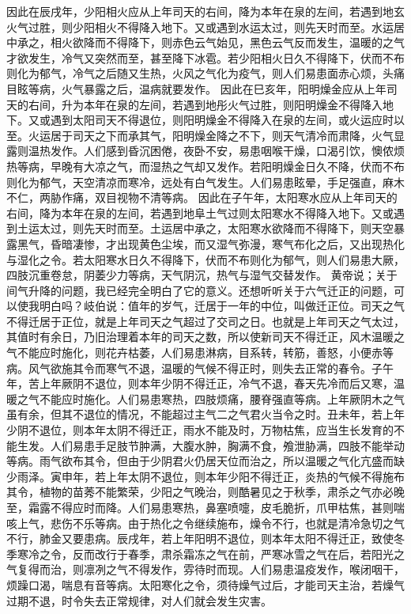 \documentclass[a4paper,12pt,UTF8,twoside]{ctexbook}
\begin{document}
因此在辰戌年，少阳相火应从上年司天的右间，降为本年在泉的左间，若遇到地玄火气过胜，则少阳相火不得降入地下。又或遇到水运太过，则先天时而至。水运居中承之，相火欲降而不得降下，则赤色云气始见，黑色云气反而发生，温暖的之气才欲发生，冷气又突然而至，甚至降下冰雹。若少阳相火日久不得降下，伏而不布则化为郁气，冷气之后随又生热，火风之气化为疫气，则人们易患面赤心烦，头痛目眩等病，火气暴露之后，温病就要发作。
因此在巳亥年，阳明燥金应从上年司天的右间，升为本年在泉的左间，若遇到地彤火气过胜，则阳明燥金不得降入地下。又或遇到太阳司天不得退位，则阳明燥金不得降入在泉的左间，或火运应时以至。火运居于司天之下而承其气，阳明燥金降之不下，则天气清冷而肃降，火气显露则温热发作。人们感到昏沉困倦，夜卧不安，易患咽喉干燥，口渴引饮，懊侬烦热等病，早晚有大凉之气，而湿热之气却又发作。若阳明燥金日久不降，伏而不布则化为郁气，天空清凉而寒冷，远处有白气发生。人们易患眩晕，手足强直，麻木不仁，两胁作痛，双目视物不清等病。
因此在子午年，太阳寒水应从上年司天的右间，降为本年在泉的左间，若遇到地阜土气过则太阳寒水不得降入地下。又或遇到土运太过，则先天时而至。土运居中承之，太阳寒水欲降而不得降下，则天空暴露黑气，昏暗凄惨，才出现黄色尘埃，而又湿气弥漫，寒气布化之后，又出现热化与湿化之令。若太阳寒水日久不得降下，伏而不布则化为郁气，则人们易患大厥，四肢沉重卷怠，阴萎少力等病，天气阴沉，热气与湿气交替发作。
黄帝说；关于间气升降的问题，我已经完全明白了它的意义。还想听听关于六气迁正的问题，可以使我明白吗？岐伯说：值年的岁气，迁居于一年的中位，叫做迁正位。司天之气不得迁居于正位，就是上年司天之气超过了交司之日。也就是上年司天之气太过，其值时有余日，乃旧治理着本年的司天之数，所以使新司天不得迁正，风木温暖之气不能应时施化，则花卉枯萎，人们易患淋病，目系转，转筋，善怒，小便赤等病。风气欲施其令而寒气不退，温暖的气候不得正时，则失去正常的春令。子午年，苦上年厥阴不退位，则本年少阴不得迁正，冷气不退，春天先冷而后又寒，温暖之气不能应时施化。人们易患寒热，四肢烦痛，腰脊强直等病。上年厥阴木之气虽有余，但其不退位的情况，不能超过主气二之气君火当令之时。丑未年，若上年少阴不退位，则本年太阴不得迁正，雨水不能及时，万物枯焦，应当生长发育的不能生发。人们易患手足肢节肿满，大腹水肿，胸满不食，飧泄胁满，四肢不能举动等病。雨气欲布其令，但由于少阴君火仍居天位而治之，所以温暖之气化亢盛而缺少雨泽。寅申年，若上年太阴不退位，则本年少阳不得迁正，炎热的气候不得施布其令，植物的苗莠不能繁荣，少阳之气晚治，则酷暑见之于秋季，肃杀之气亦必晚至，霜露不得应时而降。人们易患寒热，鼻塞喷嚏，皮毛脆折，爪甲枯焦，甚则喘咳上气，悲伤不乐等病。由于热化之令继续施布，燥令不行，也就是清冷急切之气不行，肺金又要患病。辰戌年，若上年阳明不退位，则本年太阳不得迁正，致使冬季寒冷之令，反而改行于春季，肃杀霜冻之气在前，严寒冰雪之气在后，若阳光之气复得而治，则凛冽之气不得发作，雰待时而现。人们易患温疫发作，喉闭咽干，烦躁口渴，喘息有音等病。太阳寒化之令，须待燥气过后，才能司天主治，若燥气过期不退，时令失去正常规律，对人们就会发生灾害。
\end{document}
